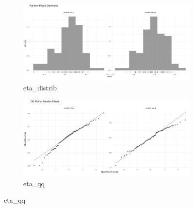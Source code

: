 \begin{figure}[htbp]
    \begin{subfigure}[b]{0.45\linewidth}
        \centering
        \includegraphics[width=\linewidth]{fig/img/Xpose/eta_distrib.pdf}
        \caption{eta\_distrib}
        \label{fig:eta_distrib}
    \end{subfigure}
    \hfill
    \begin{subfigure}[b]{0.45\linewidth}
        \centering
        \includegraphics[width=\linewidth]{fig/img/Xpose/eta_qq.pdf}
        \caption{eta\_qq}
        \label{fig:eta_qq}
    \end{subfigure}

    \vspace{1em}


\end{figure}
